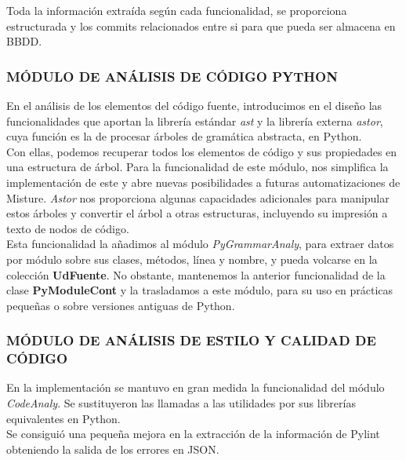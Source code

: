 Toda la información extraída según cada funcionalidad, se proporciona estructurada y los commits relacionados entre si para que pueda ser almacena en BBDD.\\


\subsubsection{MÓDULO DE ANÁLISIS DE CÓDIGO PYTHON} 
\label{subsec:mod_anal_python}

En el análisis de los elementos del código fuente, introducimos en el diseño las funcionalidades que aportan la librería estándar \textit{ast} y la librería externa \textit{astor}, cuya función es la de procesar árboles de gramática abstracta, en Python.\\


Con ellas, podemos recuperar todos los elementos de código y sus propiedades en una estructura de árbol. Para la funcionalidad de este módulo, nos simplifica la implementación de este y abre nuevas posibilidades a futuras automatizaciones de Misture. \textit{Astor} nos proporciona algunas capacidades adicionales para manipular estos árboles y convertir el árbol a otras estructuras, incluyendo su impresión a texto de nodos de código.\\


Esta funcionalidad la añadimos al módulo \textit{PyGrammarAnaly}, para extraer datos por módulo sobre sus clases, métodos, línea y nombre, y pueda volcarse en la colección \textbf{UdFuente}. No obstante, mantenemos la anterior funcionalidad de la clase \textbf{PyModuleCont} y la trasladamos a este módulo, para su uso en prácticas pequeñas o sobre versiones antiguas de Python.\\


\subsubsection{MÓDULO DE ANÁLISIS DE ESTILO Y CALIDAD DE CÓDIGO} 
\label{subsec:mod_anal_codigo}

En la implementación se mantuvo en gran medida la funcionalidad del módulo \textit{CodeAnaly}. Se sustituyeron las llamadas a las utilidades por sus librerías equivalentes en Python.\\


Se consiguió una pequeña mejora en la extracción de la información de Pylint obteniendo la salida de los errores en JSON.\\


